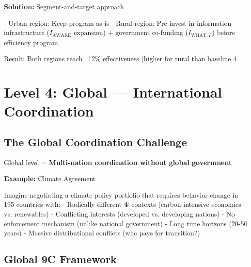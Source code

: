 \textbf{Solution:} Segment-and-target approach

- Urban region: Keep program as-is
- Rural region: Pre-invest in information infrastructure ($I_{\text{AWARE}}$ expansion) + government co-funding ($I_{\text{WHAT},F}$) before efficiency program

Result: Both regions reach ~12\% effectiveness (higher for rural than baseline 4%


\section{Level 4: Global --- International Coordination}
\label{sec:level4-global}

\subsection{The Global Coordination Challenge}

Global level = \textbf{Multi-nation coordination without global government}

\textbf{Example:} Climate Agreement

Imagine negotiating a climate policy portfolio that requires behavior change in 195 countries with:
- Radically different Ψ contexts (carbon-intensive economies vs. renewables)
- Conflicting interests (developed vs. developing nations)
- No enforcement mechanism (unlike national government)
- Long time horizons (20-50 years)
- Massive distributional conflicts (who pays for transition?)

\subsection{Global 9C Framework}

